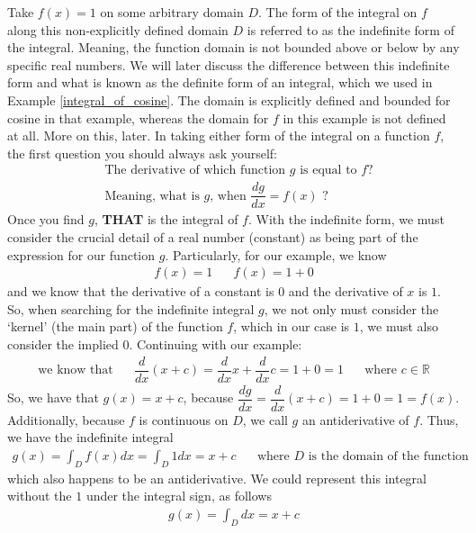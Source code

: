 \begin{example}
Take $f(x) = 1$ on some arbitrary domain $D$. The form of the integral on $f$ along this non-explicitly defined domain $D$ is referred to as the indefinite form of the integral. Meaning, the function domain is not bounded above or below by any specific real numbers. We will later discuss the difference between this indefinite form and what is known as the definite form of an integral, which we used in Example \ref{integral_of_cosine}. The domain is explicitly defined and bounded for cosine in that example, whereas the domain for $f$ in this example is not defined at all. More on this, later. In taking either form of the integral on a function $f$, the first question you should always ask yourself:
\begin{align*}
    &\text{The derivative of which function $g$ is equal to} \hspace{4pt} f?\\[2ex]
    &\text{Meaning, what is $g$, when} \hspace{4pt} \dfrac{dg}{dx} = f(x) \hspace{4pt} \text{?}
\end{align*}
Once you find $g$, \textbf{THAT} is the integral of $f$. With the indefinite form, we must consider the crucial detail of a real number (constant) as being part of the expression for our function $g$. Particularly, for our example, we know
\begin{align*}
f(x) = 1 \hspace{20pt} f(x) = 1 + 0
\end{align*}
and we know that the derivative of a constant is $0$ and the derivative of $x$ is $1$. So, when searching for the indefinite integral $g$, we not only must consider the `kernel' (the main part) of the function $f$, which in our case is $1$, we must also consider the implied $0$. 
Continuing with our example:
\begin{align*}
    \text{we know that} \hspace{20pt} \dfrac{d}{dx} (x+c) = \dfrac{d}{dx} x + \dfrac{d}{dx} c = 1 + 0 = 1 \hspace{20pt} \text{where} \hspace{4pt} c \in \mathbb{R}
\end{align*}
So, we have that $g(x) = x+c$, because $\dfrac{dg}{dx} = \dfrac{d}{dx}(x+c) = 1 + 0 = 1 = f(x)$. Additionally, because $f$ is continuous on $D$, we call $g$ an antiderivative of $f$. Thus, we have the indefinite integral
\begin{align*}
    g(x) = \int_{D} f(x)dx = \int_{D} 1 dx = x + c \hspace{20pt} \text{where $D$ is the domain of the function}
\end{align*}
which also happens to be an antiderivative. We could represent this integral without the $1$ under the integral sign, as follows
\begin{align*}
    g(x) = \int_{D} dx = x+c
\end{align*}
\end{example}


